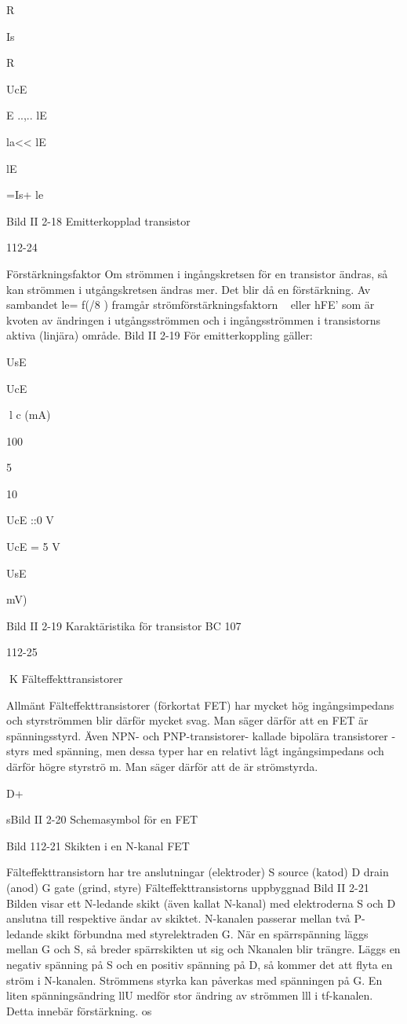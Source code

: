 {R

Is

R

UcE

E
..,..
lE

la<< lE

lE

=Is+ le

Bild II 2-18 Emitterkopplad transistor

112-24

Förstärkningsfaktor
Om strömmen i ingångskretsen för en transistor ändras, så kan strömmen i utgångskretsen ändras mer. Det blir då en förstärkning.
Av sambandet le= f(/8 ) framgår strömförstärkningsfaktorn ~ eller hFE' som är kvoten av ändringen i utgångsströmmen och i
ingångsströmmen i transistorns aktiva (linjära) område.
Bild II 2-19
För emitterkoppling gäller:

UsE

UcE

l c (mA)

100

5

10

UcE ::0 V

UcE = 5 V

UsE {mV)

Bild II 2-19 Karaktäristika för transistor BC 107

112-25

K
Fälteffekttransistorer

Allmänt
Fälteffekttransistorer (förkortat FET) har
mycket hög ingångsimpedans och styrströmmen blir därför mycket svag. Man säger
därför att en FET är spänningsstyrd.
Även NPN- och PNP-transistorer- kallade bipolära transistorer - styrs med spänning, men dessa typer har en relativt lågt
ingångsimpedans och därför högre styrströ m.
Man säger därför att de är strömstyrda.

D+

sBild II 2-20 Schemasymbol för en FET

Bild 112-21 Skikten i en N-kanal FET

Fälteffekttransistorn har tre anslutningar
(elektroder)
S source (katod)
D drain (anod)
G gate (grind, styre)
Fälteffekttransistorns uppbyggnad
Bild II 2-21
Bilden visar ett N-ledande skikt (även kallat
N-kanal) med elektroderna S och D anslutna
till respektive ändar av skiktet. N-kanalen
passerar mellan två P-ledande skikt förbundna med styrelektraden G.
När en spärrspänning läggs mellan G
och S, så breder spärrskikten ut sig och Nkanalen blir trängre. Läggs en negativ spänning på S och en positiv spänning på D, så
kommer det att flyta en ström i N-kanalen.
Strömmens styrka kan påverkas med spänningen på G.
En liten spänningsändring llU medför
stor ändring av strömmen lll i tf-kanalen.
Detta innebär förstärkning. os

}}
